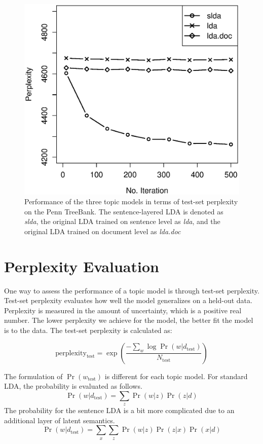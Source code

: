 \begin{figure}[!ht]
  \centering
  \includegraphics[width=\columnwidth]{ppl.eps}
  \caption{Performance of the three topic models in terms of test-set
  perplexity on the Penn TreeBank.  The sentence-layered LDA is denoted as {\it
  slda}, the original LDA trained on sentence level as {\it lda}, and the
  original LDA trained on document level as {\it lda.doc} }
  \label{f:perplexity}
\end{figure}

\section{Perplexity Evaluation} \label{s:perplexity-evaluation}

One way to assess the performance of a topic model is through test-set
perplexity.  Test-set perplexity evaluates how well the model generalizes on a
held-out data.  Perplexity is measured in the amount of uncertainty, which is a
positive real number.  The lower perplexity we achieve for the model, the
better fit the model is to the data.  The test-set perplexity is calculated as:

\[ \mathrm{perplexity_{test}} = \exp(\frac{- \sum_w \log \Pr(w|d_\mathrm{test})}{N_\mathrm{test}}) \]

The formulation of $\Pr(w_\mathrm{test})$ is different for each topic model.
For standard LDA, the probability is evaluated as follows.  \[
\Pr(w|d_\mathrm{test}) = \sum_z \Pr(w|z) \Pr(z|d) \] The probability for the
sentence LDA is a bit more complicated due to an additional layer of latent
semantics.  \[ \Pr(w|d_\mathrm{test}) = \sum_x \sum_z \Pr(w|z) \Pr(z|x)
\Pr(x|d) \] 

